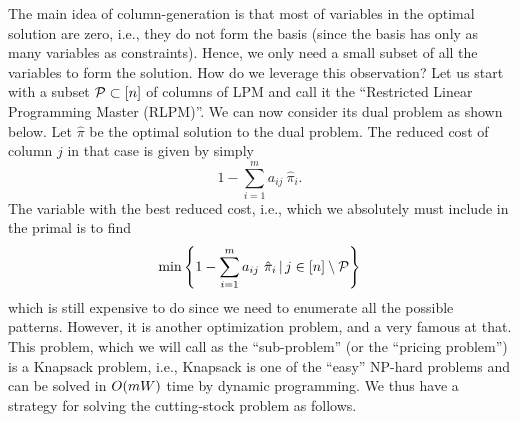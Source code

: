 \documentclass[letterpaper, 10pt, twocolumn, reqno]{amsart}
\begin{document}
The main idea of column-generation is that most of variables in the optimal solution are zero, i.e., they do not form the basis (since the basis has only as many variables as constraints). Hence, we only need a small subset of all the variables to form the solution. How do we leverage this observation? Let us start with a subset $\mathcal{P} \subset [n]$ of columns of LPM and call it the ``Restricted Linear Programming Master (RLPM)''. We can now consider its dual problem as shown below.
Let $\hat{\pi}$ be the optimal solution to the dual problem. The reduced cost of column $j$ in that case is given by simply
$$
1  - \sum_{i=1}^m a_{ij}\ \hat{\pi}_i.
$$
The variable with the best reduced cost, i.e., which we absolutely must include in the primal is to find
$$
\min \left\{1  - \sum_{i=1}^m a_{ij}\ \hat{\pi}_i \, \vert \, j \in [n] \setminus \mathcal{P}\right\}
$$
which is still expensive to do since we need to enumerate all the possible patterns. However, it is another optimization problem, and a very famous at that. This problem, which we will call as the ``sub-problem'' (or the ``pricing problem'') is a Knapsack problem, i.e.,
Knapsack is one of the ``easy'' NP-hard problems and can be solved in $O(mW)$ time by dynamic programming. We thus have a strategy for solving the cutting-stock problem as follows.
\end{document}
